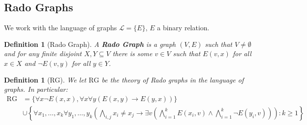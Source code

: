 \documentclass[]{article}
\theoremstyle{custhm}
\theoremstyle{cusdef}
\newtheorem{defin}[theorem]{Definition}
\theoremstyle{custhm}
\theoremstyle{custhm}
\theoremstyle{custhm}
\theoremstyle{ex}
\theoremstyle{custhm}
\theoremstyle{cusdef}
\theoremstyle{remark}
\theoremstyle{remark}
\newcommand{\ra}{\rightarrow}
\newcommand{\undf}[1]{\textit{\textbf{#1}}}
\renewcommand{\L}{\mathcal{L}}
\newcommand{\rg}{\textrm{RG}}
\renewcommand{\subset}{\subseteq}
\begin{document}
\subsection*{Rado Graphs}

We work with the language of graphs $\L = \{E\}$, $E$ a binary relation.

\begin{defin}[Rado Graph]
A \undf{Rado Graph} is a graph $(V,E)$ such that $V\ne \emptyset$ and for any finite disjoint $X,Y\subset V$ there is some $v\in V$ such that $E(v,x)$ for all $x\in X$ and $\neg E(v,y)$ for all $y\in Y$.
\end{defin}
\begin{defin}[RG]
We let $\rg$ be the theory of Rado graphs in the language of graphs. In particular:
\begin{align*}
	\rg &= \{ \forall x \neg E(x,x),\forall x\forall y(E(x,y)\ra E(y,x)) \}\\
		&\cup \left\lbrace \forall x_1,\dots,x_k\forall y_1,\dots,y_k\left(\bigwedge_{i,j}x_i\ne x_j \ra \exists v\left(\bigwedge_{i=1}^{k}E(x_i,v) \land \bigwedge_{i=1}^{k}\neg E(y_i,v)\right)\right):k\ge 1\right\rbrace
\end{align*}
\end{defin}
\end{document}
